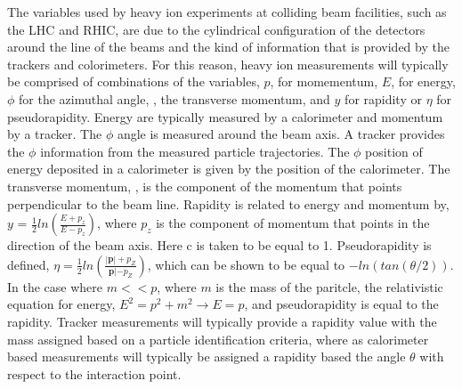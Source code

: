       The variables used by heavy ion experiments at colliding beam facilities, 
        such as the LHC and RHIC, are due to the cylindrical configuration of 
        the detectors around the line of the beams and the kind of information 
        that is provided by the trackers and colorimeters.
      For this reason, heavy ion measurements will typically be comprised of 
        combinations of the variables, $p$, for momementum, $E$, for energy, 
        $\phi$ for the azimuthal angle, \pt, the transverse momentum, and $y$ for
        rapidity or $\eta$ for pseudorapidity. 
      Energy are typically measured by a calorimeter and momentum by a tracker.
      The $\phi$ angle is measured around the beam axis. 
      A tracker provides the $\phi$ information from the measured particle 
        trajectories.
      The $\phi$ position of energy deposited in a calorimeter is given by the
        position of the calorimeter. 
      The transverse momentum, \pt, is the component of the momentum that points
        perpendicular to the beam line. 
      Rapidity is related to energy and momentum by, 
      $y$ = $\frac{1}{2}ln\left(\frac{E+p_{z}}{E-p_{z}}\right)$, where $p_{z}$ is the component
        of momentum that points in the direction of the beam axis. 
      Here c is taken to be equal to 1. 
      Pseudorapidity is defined,
        $\eta=\frac{1}{2}ln\left(\frac{|\mathbf{p}|+p_{Z}}{\mathbf{p}|-p_{Z}}\right)$, 
        which can be shown to be equal to $-ln\left(tan\left(\theta/2\right)\right)$.
      In the case where $m << p$, where $m$ is the mass of the paritcle, the 
        relativistic equation for energy, $E^2=p^2+m^2 \rightarrow E=p$, and 
        pseudorapidity is equal to the rapidity. 
      Tracker measurements will typically provide a rapidity value with 
        the mass assigned based on a particle identification criteria, where as 
        calorimeter based measurements will typically be assigned a rapidity 
        based the angle $\theta$ with respect to the interaction point.

